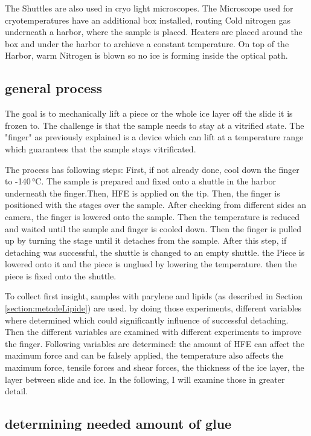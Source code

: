 The Shuttles are also used in cryo light microscopes. The Microscope used for cryotemperatures have an additional box installed, routing Cold nitrogen gas underneath a harbor, where the sample is placed. Heaters are placed around the box and under the harbor to archieve a constant temperature. On top of the Harbor, warm Nitrogen is blown so no ice is forming inside the optical path.

\FloatBarrier

\subsection{general process}

The goal is to mechanically lift a piece or the whole ice layer off the slide it is frozen to. The challenge is that the sample needs to stay at a vitrified state. The "finger" as previously explained is a device which can lift at a temperature range which guarantees that the sample stays vitrificated. 

The process has following steps: First, if not already done, cool down the finger to -140\,°C. The sample is prepared and fixed onto a shuttle in the harbor underneath  the finger.Then, HFE is applied on the tip. Then, the finger is positioned with the stages over the sample. After checking from different sides an camera, the finger is lowered onto the sample. Then the temperature is reduced and waited until the sample and finger is cooled down. Then the finger is pulled up by turning the stage until it detaches from the sample. After this step, if detaching was successful, the shuttle is changed to an empty shuttle. the Piece is lowered onto it and the piece is unglued by lowering the temperature. then the piece is fixed onto the shuttle.

To collect first insight, samples with parylene and lipids (as described in Section \ref{section:metodeLipide}) are used. by doing those experiments, different variables where determined which could significantly influence of successful detaching. Then the different variables are examined with different experiments to improve the finger. Following variables are determined: the amount of HFE can affect the maximum force and can be falsely applied, the temperature also affects the maximum force, tensile forces and shear forces, the thickness of the ice layer, the layer between slide and ice. In the following, I will examine those in greater detail.

\subsection{determining needed amount of glue}

